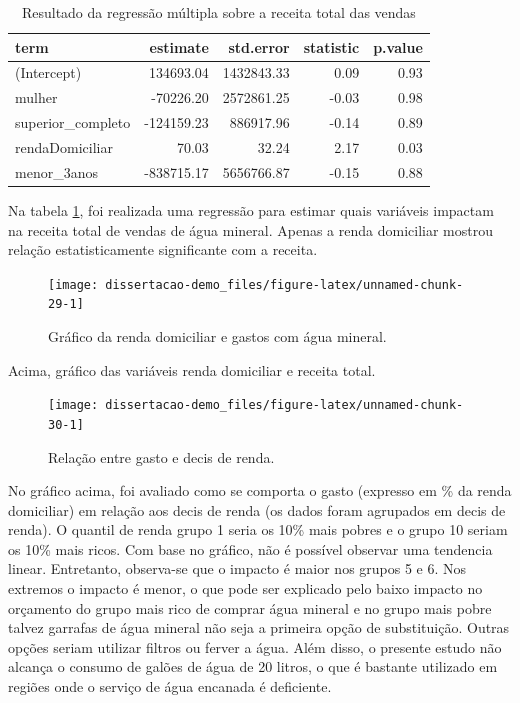\documentclass[
  12pt,
]{book}
\begin{document}
\begin{table}

\caption{\label{tab:regreceita}Resultado da regressão múltipla sobre a receita total das vendas}
\centering
\begin{tabular}[t]{l|r|r|r|r}
\hline
term & estimate & std.error & statistic & p.value\\
\hline
(Intercept) & 134693.04 & 1432843.33 & 0.09 & 0.93\\
\hline
mulher & -70226.20 & 2572861.25 & -0.03 & 0.98\\
\hline
superior\_completo & -124159.23 & 886917.96 & -0.14 & 0.89\\
\hline
rendaDomiciliar & 70.03 & 32.24 & 2.17 & 0.03\\
\hline
menor\_3anos & -838715.17 & 5656766.87 & -0.15 & 0.88\\
\hline
\end{tabular}
\end{table}

Na tabela \ref{tab:regreceita}, foi realizada uma regressão para estimar quais variáveis impactam na receita total de vendas de água mineral. Apenas a renda domiciliar mostrou relação estatisticamente significante com a receita.

\begin{figure}

{\centering \texttt{[image: dissertacao-demo\_files/figure-latex/unnamed-chunk-29-1]} 

}

\caption{Gráfico da renda domiciliar e gastos com água mineral.}\label{fig:unnamed-chunk-29}
\end{figure}

Acima, gráfico das variáveis renda domiciliar e receita total.

\begin{figure}

{\centering \texttt{[image: dissertacao-demo\_files/figure-latex/unnamed-chunk-30-1]} 

}

\caption{Relação entre gasto e decis de renda.}\label{fig:unnamed-chunk-30}
\end{figure}

No gráfico acima, foi avaliado como se comporta o gasto (expresso em \% da renda domiciliar) em relação aos decis de renda (os dados foram agrupados em decis de renda). O quantil de renda grupo 1 seria os 10\% mais pobres e o grupo 10 seriam os 10\% mais ricos. Com base no gráfico, não é possível observar uma tendencia linear. Entretanto, observa-se que o impacto é maior nos grupos 5 e 6. Nos extremos o impacto é menor, o que pode ser explicado pelo baixo impacto no orçamento do grupo mais rico de comprar água mineral e no grupo mais pobre talvez garrafas de água mineral não seja a primeira opção de substituição. Outras opções seriam utilizar filtros ou ferver a água. Além disso, o presente estudo não alcança o consumo de galões de água de 20 litros, o que é bastante utilizado em regiões onde o serviço de água encanada é deficiente.
\end{document}
